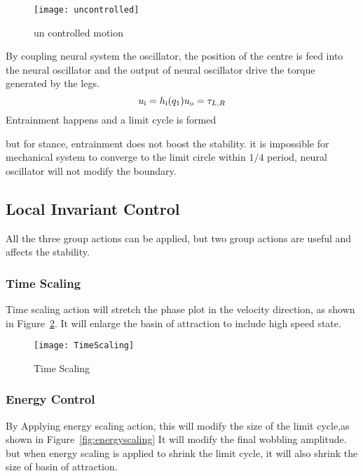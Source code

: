\begin{figure}[!htbp]
  \begin{center}
     \texttt{[image: uncontrolled]}
    \caption{un controlled motion}
    \label{fig:stancepostures}
\end{center}
\end{figure}





By coupling neural system the oscillator, the position of the centre is feed into the neural oscillator and the output of neural oscillator drive the torque generated by the legs.
\[
u_{\mathrm{i}}=h_{\mathrm{i}}(q_1)\\
u_{\mathrm{o}}=\tau_{L,R}
\]
Entrainment happens and a limit cycle is formed

but for stance, entrainment does not boost the stability.
it is impossible for mechanical system to converge to the limit circle within $1/4$ period, neural oscillator will not modify the boundary.


\subsection{Local Invariant Control}
All the three group actions can be applied, but two group actions are useful and affects the stability.
\subsubsection*{Time Scaling}
Time scaling action will stretch the phase plot in the velocity direction, as shown in Figure~\ref{fig:stanceTimeScaling}.
It will enlarge the basin of attraction to include high speed state.
\begin{figure}[!htbp]
  \begin{center}
      \texttt{[image: TimeScaling]}
    \caption{Time Scaling}
    \label{fig:stanceTimeScaling}
\end{center}
\end{figure}



\subsubsection*{Energy Control}
By Applying energy scaling action, this will modify the size of the limit cycle,as shown in Figure~\ref{fig:energyscaling}
It will modify the final wobbling amplitude.
but when energy scaling is applied to shrink the limit cycle,
it will also shrink the size of basin of attraction.


